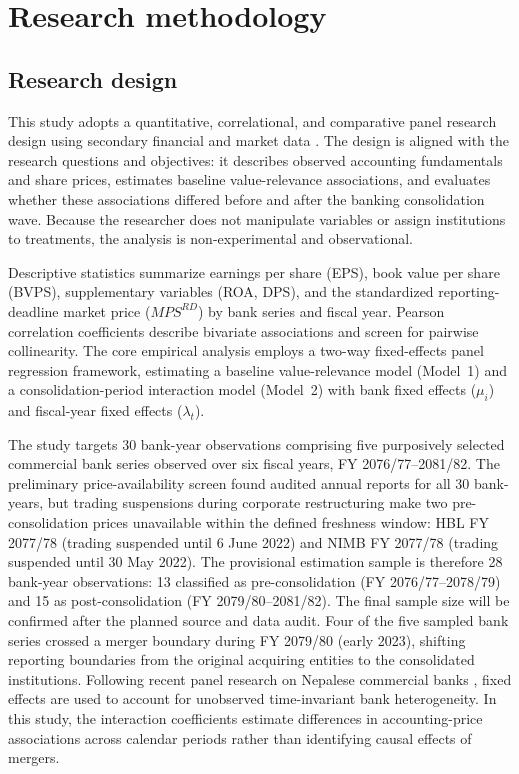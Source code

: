 \section{Research methodology}

\subsection{Research design}
This study adopts a quantitative, correlational, and comparative panel research design using secondary financial and market data \citep{pant2016}. The design is aligned with the research questions and objectives: it describes observed accounting fundamentals and share prices, estimates baseline value-relevance associations, and evaluates whether these associations differed before and after the banking consolidation wave. Because the researcher does not manipulate variables or assign institutions to treatments, the analysis is non-experimental and observational.

Descriptive statistics summarize earnings per share (EPS), book value per share (BVPS), supplementary variables (ROA, DPS), and the standardized reporting-deadline market price ($\mathit{MPS}^{RD}$) by bank series and fiscal year. Pearson correlation coefficients describe bivariate associations and screen for pairwise collinearity. The core empirical analysis employs a two-way fixed-effects panel regression framework, estimating a baseline value-relevance model (Model~1) and a consolidation-period interaction model (Model~2) with bank fixed effects ($\mu_i$) and fiscal-year fixed effects ($\lambda_t$).

The study targets 30 bank-year observations comprising five purposively selected
commercial bank series observed over six fiscal years, FY 2076/77--2081/82. The
preliminary price-availability screen found audited annual reports for all 30
bank-years, but trading suspensions during corporate restructuring make two
pre-consolidation prices unavailable within the defined freshness window: HBL FY
2077/78 (trading suspended until 6 June 2022) and NIMB FY 2077/78 (trading
suspended until 30 May 2022). The provisional estimation sample is therefore 28
bank-year observations: 13 classified as pre-consolidation (FY 2076/77--2078/79)
and 15 as post-consolidation (FY 2079/80--2081/82). The final sample size will be
confirmed after the planned source and data audit. Four of the five
sampled bank series crossed a merger boundary during FY 2079/80 (early 2023),
shifting reporting boundaries from the original acquiring entities to the
consolidated institutions. Following recent panel research on Nepalese commercial
banks \citep{gurungdahal2025}, fixed effects are used to account for
unobserved time-invariant bank heterogeneity. In this study, the interaction
coefficients estimate differences in accounting-price associations across
calendar periods rather than identifying causal effects of mergers.

